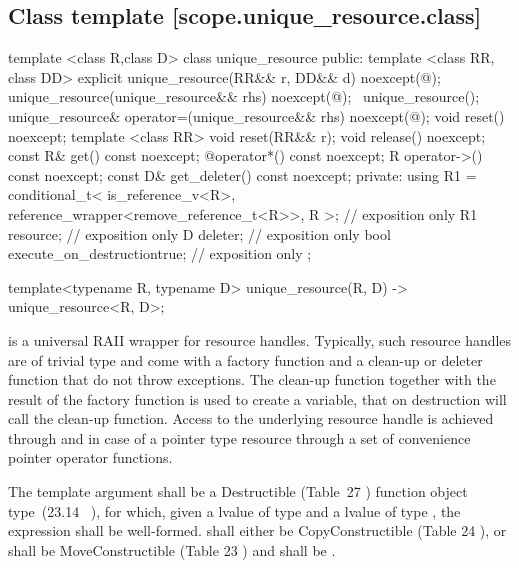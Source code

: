 \documentclass[ebook,11pt,article]{memoir}
\begin{document}
\subsection {Class template  [scope.unique_resource.class]}

\begin{codeblock}
template <class R,class D>
class unique_resource {
public:
  template <class RR, class DD>
    explicit 
    unique_resource(RR&& r, DD&& d) noexcept(@\seebelow@);
  unique_resource(unique_resource&& rhs) noexcept(@\seebelow@);
  ~unique_resource();
  unique_resource& operator=(unique_resource&& rhs) noexcept(@\seebelow@);
  void reset() noexcept;
  template <class RR>
    void reset(RR&& r);
  void release() noexcept;
  const R& get() const noexcept;
  @\seebelow@ operator*() const noexcept;
  R operator->() const noexcept;  
  const D& get_deleter() const noexcept;
private:
  using R1 = conditional_t< is_reference_v<R>, 
               reference_wrapper<remove_reference_t<R>>, R >; // exposition only
  R1   resource; // exposition only
  D    deleter;  // exposition only
  bool execute_on_destruction{true}; // exposition only
};

template<typename R, typename D>
  unique_resource(R, D) 
    -> unique_resource<R, D>;
\end{codeblock}

\pnum
\begin{note}
 is a universal RAII wrapper for resource handles.
Typically, such resource handles are of trivial type and come with a factory function and a clean-up or deleter function that do not throw exceptions.
The clean-up function together with the result of the factory function is used to create a  variable, that on destruction will call the clean-up function. Access to the underlying resource handle is achieved through  and in case of a pointer type resource through a set of convenience pointer operator functions.
\end{note}


\pnum 
The template argument
 shall be a 
Destructible 
(Table~27
) function object type~(23.14~
), 
for which, given
a lvalue  of type  and a lvalue
 of type , the expression
 shall be well-formed. %
 shall either be CopyConstructible (Table 24
), or 
 shall be MoveConstructible (Table 23
) and
 shall be .
\end{document}
